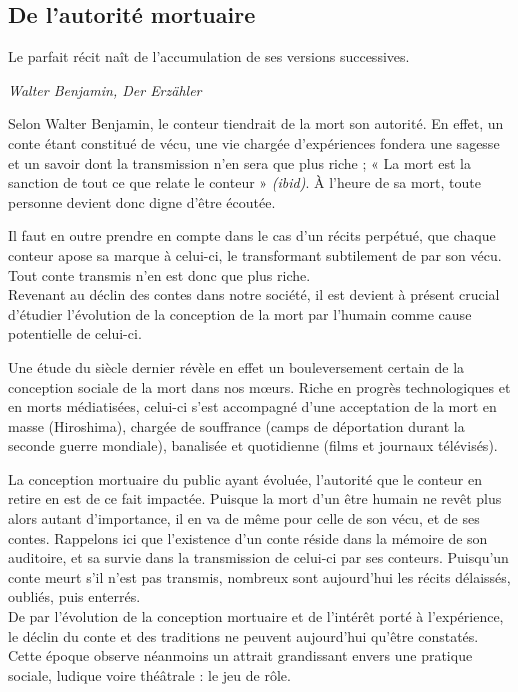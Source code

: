 \subsection{De l'autorité mortuaire}

\begin{shadequote}
Le parfait récit naît de l'accumulation de ses versions successives. \par\emph{Walter Benjamin, Der Erzähler}
\end{shadequote}

Selon Walter Benjamin, le conteur tiendrait de la mort son autorité. En effet, un conte étant constitué de vécu, une vie chargée d'expériences fondera une sagesse et un savoir dont la transmission n'en sera que plus riche ; « La mort est la sanction de tout ce que relate le conteur » \textit{(ibid)}. À l'heure de sa mort, toute personne devient donc digne d'être écoutée.

Il faut en outre prendre en compte dans le cas d'un récits perpétué, que chaque conteur apose sa marque à celui-ci, le transformant subtilement de par son vécu. Tout conte transmis n'en est donc que plus riche.\\


Revenant au déclin des contes dans notre société, il est devient à présent crucial d'étudier l'évolution de la conception de la mort par l'humain comme cause potentielle de celui-ci.

Une étude du siècle dernier révèle en effet un bouleversement certain de la conception sociale de la mort dans nos m\oe urs. Riche en progrès technologiques et en morts médiatisées, celui-ci s'est accompagné d'une acceptation de la mort en masse (Hiroshima), chargée de souffrance (camps de déportation durant la seconde guerre mondiale), banalisée et quotidienne (films et journaux télévisés).

La conception mortuaire du public ayant évoluée, l'autorité que le conteur en retire en est de ce fait impactée. Puisque la mort d'un être humain ne revêt plus alors autant d'importance, il en va de même pour celle de son vécu, et de ses contes. Rappelons ici que l'existence d'un conte réside dans la mémoire de son auditoire, et sa survie dans la transmission de celui-ci par ses conteurs. Puisqu'un conte meurt s'il n'est pas transmis, nombreux sont aujourd'hui les récits délaissés, oubliés, puis enterrés.\\

De par l'évolution de la conception mortuaire et de l'intérêt porté à l'expérience, le déclin du conte et des traditions ne peuvent aujourd'hui qu'être constatés. Cette époque observe néanmoins un attrait grandissant envers une pratique sociale, ludique voire théâtrale : le jeu de rôle.

\clearpage
